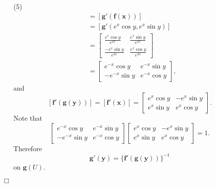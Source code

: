 \documentclass{article}
\begin{document}
\begin{enumerate}
\item[(5)]
  \begin{align*}
    [\mathbf{g}'(\mathbf{y})]
    &= [\mathbf{g}'(\mathbf{f}(\mathbf{x}))] \\
    &= [\mathbf{g}'(e^x \cos y, e^x \sin y)] \\
    &=
    \begin{bmatrix}
      \frac{e^x \cos y}{e^{2x}} & \frac{e^x \sin y}{e^{2x}} \\
      \frac{-e^x \sin y}{e^{2x}} & \frac{e^x \cos y}{e^{2x}}
    \end{bmatrix} \\
    &=
    \begin{bmatrix}
      e^{-x} \cos y & e^{-x} \sin y \\
      -e^{-x} \sin y & e^{-x} \cos y
    \end{bmatrix},
  \end{align*}
  and
  \[
    [\mathbf{f}'(\mathbf{g}(\mathbf{y}))]
    = [\mathbf{f}'(\mathbf{x})]
    =
    \begin{bmatrix}
      e^x \cos y & -e^x \sin y \\
      e^x \sin y &  e^x \cos y
    \end{bmatrix}.
  \]
  Note that
  \[
    \begin{bmatrix}
      e^{-x} \cos y & e^{-x} \sin y \\
      -e^{-x} \sin y & e^{-x} \cos y
    \end{bmatrix}
    \begin{bmatrix}
      e^x \cos y & -e^x \sin y \\
      e^x \sin y &  e^x \cos y
    \end{bmatrix}
    = 1.
  \]
  Therefore
  \[
    \mathbf{g}'(\mathbf{y})
    = \{ \mathbf{f}'(\mathbf{g}(\mathbf{y})) \}^{-1}
  \]
  on $\mathbf{g}(U)$.
\end{enumerate}
$\Box$ \\
\end{document}
